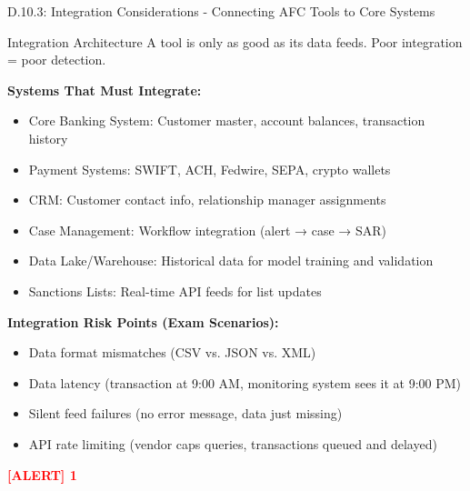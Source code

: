 \documentclass[11pt,a4paper]{beamer}
\newcommand{\redflag}[1]{\textcolor{red}{\textbf{[ALERT] 1}}}
\begin{document}
\begin{frame}{D.10.3: Integration Considerations - Connecting AFC Tools to Core Systems}
	\begin{block}{Integration Architecture}
		A tool is only as good as its data feeds. Poor integration = poor detection.
	\end{block}
	\textbf{Systems That Must Integrate:}
	\begin{itemize}
		\item Core Banking System: Customer master, account balances, transaction history
		\item Payment Systems: SWIFT, ACH, Fedwire, SEPA, crypto wallets
		\item CRM: Customer contact info, relationship manager assignments
		\item Case Management: Workflow integration (alert → case → SAR)
		\item Data Lake/Warehouse: Historical data for model training and validation
		\item Sanctions Lists: Real-time API feeds for list updates
	\end{itemize}
	\textbf{Integration Risk Points (Exam Scenarios):}
	\begin{itemize}
		\item Data format mismatches (CSV vs. JSON vs. XML)
		\item Data latency (transaction at 9:00 AM, monitoring system sees it at 9:00 PM)
		\item Silent feed failures (no error message, data just missing)
		\item API rate limiting (vendor caps queries, transactions queued and delayed)
	\end{itemize}
	\redflag{Always require a proof of concept (POC) with your actual data before signing a contract.}
\end{frame}
\end{document}
